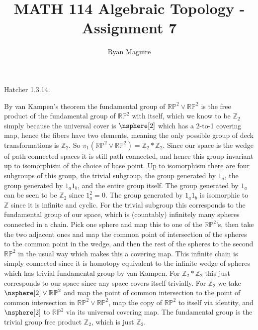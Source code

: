 \documentclass{article}                                                        %
\begin{document}
    \title{MATH 114 Algebraic Topology - Assignment 7}
    \author{Ryan Maguire}
    \date{\vspace{-5ex}}
    \maketitle
    \setcounter{section}{7}
    \begin{problem}
        Hatcher 1.3.14.
    \end{problem}
    \begin{solution}
        By van Kampen's theorem the fundamental group of
        $\mathbb{RP}^{2}\lor\mathbb{RP}^{2}$ is the free product of the
        fundamental group of $\mathbb{RP}^{2}$ with itself, which we know to be
        $\mathbb{Z}_{2}$ simply because the universal cover is $\nsphere[2]$
        which has a 2-to-1 covering map, hence the fibers have two elements,
        meaning the only possible group of deck transformations is
        $\mathbb{Z}_{2}$. So
        $\pi_{1}(\mathbb{RP}^{2}\lor\mathbb{RP}^{2})=\mathbb{Z}_{2}*\mathbb{Z}_{2}$.
        Since our space is the wedge of path connected spaces it is still path
        connected, and hence this group invariant up to isomorphism of the
        choice of base point. Up to isomorphism there are four subgroups of this
        group, the trivial subgroup, the group generated by $1_{a}$, the group
        generated by $1_{a}1_{b}$, and the entire group itself. The group
        generated by $1_{a}$ can be seen to be $\mathbb{Z}_{2}$ since
        $1_{a}^{2}=0$. The group generated by $1_{a}1_{b}$ is isomorphic to
        $\mathbb{Z}$ since it is infinite and cyclic. For the trivial subgroup
        this corresponds to the fundamental group of our space, which is
        (countably) infinitely many spheres connected in a chain. Pick one
        sphere and map this to one of the $\mathbb{RP}^{2}$'s, then take the two
        adjacent ones and map the common point of intersection of the spheres to
        the common point in the wedge, and then the rest of the spheres to the
        second $\mathbb{RP}^{2}$ in the usual way which makes this a covering
        map. This infinite chain is simply connected since it is homotopy
        equivalent to the infinite wedge of spheres which has trivial fundamental
        group by van Kampen. For $\mathbb{Z}_{2}*\mathbb{Z}_{2}$ this just
        corresponds to our space since any space covers itself trivially. For
        $\mathbb{Z}_{2}$ we take $\nsphere[2]\lor\mathbb{RP}^{2}$ and map the
        point of common intersection to the point of common intersection in
        $\mathbb{RP}^{2}\lor\mathbb{RP}^{2}$, map the copy of $\mathbb{RP}^{2}$
        to itself via identity, and $\nsphere[2]$ to $\mathbb{RP}^{2}$ via its
        universal covering map. The fundamental group is the trivial group
        free product $\mathbb{Z}_{2}$, which is just $\mathbb{Z}_{2}$.
    \end{solution}
\end{document}

